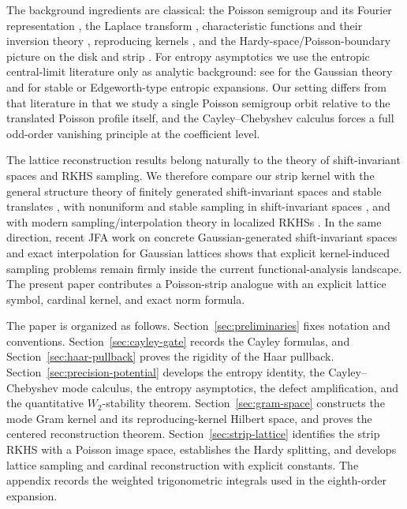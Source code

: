 The background ingredients are classical: the Poisson semigroup and its
Fourier representation \cite{Folland1995,Grafakos2014,Stein1971}, the
Laplace transform \cite{Widder1941}, characteristic functions and their
inversion theory \cite{Lukacs1970,Feller1971}, reproducing kernels
\cite{Aronszajn1950}, and the Hardy-space/Poisson-boundary picture on
the disk and strip \cite{Duren1970,Rudin1987}.  For entropy asymptotics
we use the entropic central-limit literature only as analytic
background: see \cite{Barron1986,JohnsonBarron2004,ArtsteinBallBartheNaor2004}
for the Gaussian theory and
\cite{BobkovChistyakovGotzeEdgeworth2013,BobkovChistyakovGotzeBerryEsseen2014,BobkovChistyakovGotze2013,Toscani2015,Toscani2016}
for stable or Edgeworth-type entropic expansions.  Our setting differs
from that literature in that we study a single Poisson semigroup orbit
relative to the translated Poisson profile itself, and the
Cayley--Chebyshev calculus forces a full odd-order vanishing principle
at the coefficient level.

The lattice reconstruction results belong naturally to the theory of
shift-invariant spaces and RKHS sampling.  We therefore compare our
strip kernel with the general structure theory of finitely generated
shift-invariant spaces and stable translates
\cite{deBoorDeVoreRon1994,RonShen1995,Bownik2000}, with nonuniform and
stable sampling in shift-invariant spaces
\cite{AldroubiGrochenig2001}, and with modern sampling/interpolation
theory in localized RKHSs \cite{FuhrGrochenigHaimiKlotzRomero2018}.  In
the same direction, recent JFA work on concrete Gaussian-generated
shift-invariant spaces \cite{RomeroUlanovskiiZlotnikov2024} and exact
interpolation for Gaussian lattices \cite{BaranovBelovGrochenig2022}
shows that explicit kernel-induced sampling problems remain firmly
inside the current functional-analysis landscape.  The present paper
contributes a Poisson-strip analogue with an explicit lattice symbol,
cardinal kernel, and exact norm formula.

The paper is organized as follows.
Section~\ref{sec:preliminaries} fixes notation and conventions.
Section~\ref{sec:cayley-gate} records the Cayley formulas, and
Section~\ref{sec:haar-pullback} proves the rigidity of the Haar
pullback.  Section~\ref{sec:precision-potential} develops the entropy
identity, the Cayley--Chebyshev mode calculus, the entropy asymptotics,
the defect amplification, and the quantitative $W_2$-stability theorem.
Section~\ref{sec:gram-space} constructs the mode Gram kernel and its
reproducing-kernel Hilbert space, and proves the centered
reconstruction theorem.  Section~\ref{sec:strip-lattice} identifies the
strip RKHS with a Poisson image space, establishes the Hardy splitting,
and develops lattice sampling and cardinal reconstruction with explicit
constants.
The appendix records the weighted trigonometric integrals used in the
eighth-order expansion.
